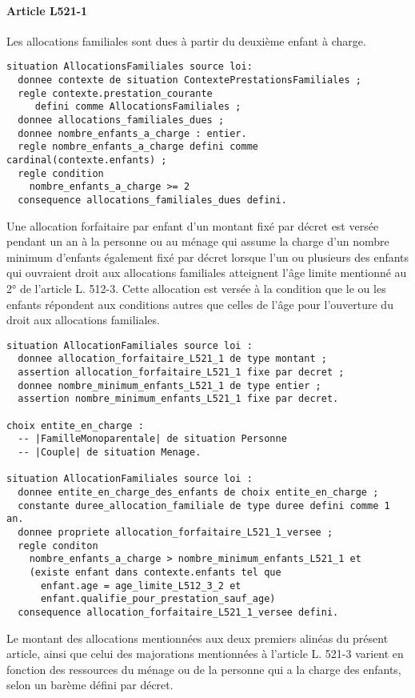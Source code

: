 \documentclass[11pt, french]{article}
\begin{document}
\paragraph{Article L521-1} Les allocations familiales sont dues à partir du deuxième enfant à charge.
\begin{lstlisting}
situation AllocationsFamiliales source loi:
  donnee contexte de situation ContextePrestationsFamiliales ;
  regle contexte.prestation_courante
     defini comme AllocationsFamiliales ;
  donnee allocations_familiales_dues ;
  donnee nombre_enfants_a_charge : entier.
  regle nombre_enfants_a_charge defini comme cardinal(contexte.enfants) ;
  regle condition
    nombre_enfants_a_charge >= 2
  consequence allocations_familiales_dues defini.
\end{lstlisting}
Une allocation forfaitaire par enfant d'un montant fixé par décret est versée pendant un an à la personne ou au ménage qui assume la charge d'un nombre minimum d'enfants également fixé par décret lorsque l'un ou plusieurs des enfants qui ouvraient droit aux allocations familiales atteignent l'âge limite mentionné au 2° de l'article L. 512-3. Cette allocation est versée à la condition que le ou les enfants répondent aux conditions autres que celles de l'âge pour l'ouverture du droit aux allocations familiales.
\begin{lstlisting}
situation AllocationFamiliales source loi :
  donnee allocation_forfaitaire_L521_1 de type montant ;
  assertion allocation_forfaitaire_L521_1 fixe par decret ;
  donnee nombre_minimum_enfants_L521_1 de type entier ;
  assertion nombre_minimum_enfants_L521_1 fixe par decret.

choix entite_en_charge :
  -- |FamilleMonoparentale| de situation Personne
  -- |Couple| de situation Menage.

situation AllocationFamiliales source loi :
  donnee entite_en_charge_des_enfants de choix entite_en_charge ;
  constante duree_allocation_familiale de type duree defini comme 1 an.
  donnee propriete allocation_forfaitaire_L521_1_versee ;
  regle conditon
    nombre_enfants_a_charge > nombre_minimum_enfants_L521_1 et
    (existe enfant dans contexte.enfants tel que
      enfant.age = age_limite_L512_3_2 et
      enfant.qualifie_pour_prestation_sauf_age)
  consequence allocation_forfaitaire_L521_1_versee defini.
\end{lstlisting}
Le montant des allocations mentionnées aux deux premiers alinéas du présent article, ainsi que celui des majorations mentionnées à l'article L. 521-3 varient en fonction des ressources du ménage ou de la personne qui a la charge des enfants, selon un barème défini par décret.
\end{document}
